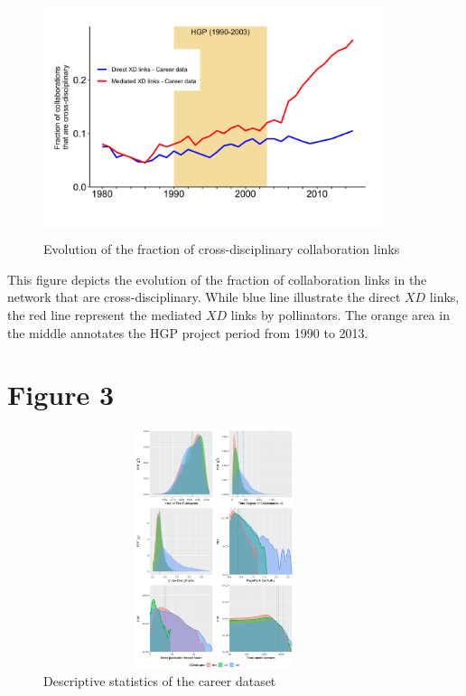 \documentclass[10pt]{article}         %
\begin{document}
\newpage
\begin{figure}[!htb]
  \centering
  \includegraphics[width=10cm, height=7cm]{Fig2B.png}
  \caption{Evolution of the fraction of cross-disciplinary collaboration links}
  \label{fig:2B}
\end{figure}

This figure depicts the evolution of the fraction of collaboration links in the network that are cross-disciplinary. While blue line illustrate the direct $XD$ links, the red line represent the mediated $XD$ links by pollinators. The orange area in the middle annotates the HGP project period from 1990 to 2013.

\newpage
\section{Figure 3}

\begin{figure}[!htb]
  \centering
  \includegraphics[width=10cm, height=7cm]{Fig3All.png}
  \caption{Descriptive statistics of the career dataset}
  \label{Fig3}
\end{figure}
\end{document}
